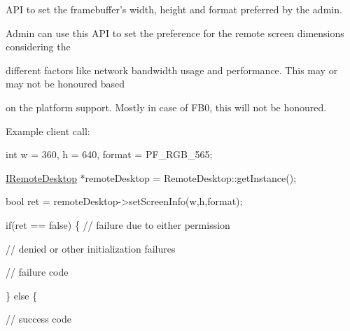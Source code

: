 \-A\-P\-I to set the framebuffer's width, height and format preferred by the admin. 

\-Admin can use this \-A\-P\-I to set the preference for the remote screen dimensions considering the

different factors like network bandwidth usage and performance. \-This may or may not be honoured based

on the platform support. \-Mostly in case of \-F\-B0, this will not be honoured.

\-Example client call\-:


\begin{DoxyPre}\end{DoxyPre}



\begin{DoxyPre}  int w = 360, h = 640, format = PF\_RGB\_565;\end{DoxyPre}



\begin{DoxyPre}  \hyperlink{classknoxremotedesktop_1_1IRemoteDesktop}{IRemoteDesktop} *remoteDesktop = RemoteDesktop::getInstance();\end{DoxyPre}



\begin{DoxyPre}  bool ret = remoteDesktop->setScreenInfo(w,h,format);\end{DoxyPre}



\begin{DoxyPre}  if(ret == false)  \{ // failure due to either permission\end{DoxyPre}



\begin{DoxyPre}                      // denied or other initialization failures\end{DoxyPre}



\begin{DoxyPre}     // failure code\end{DoxyPre}



\begin{DoxyPre}  \} else \{\end{DoxyPre}



\begin{DoxyPre}     // success code\end{DoxyPre}



